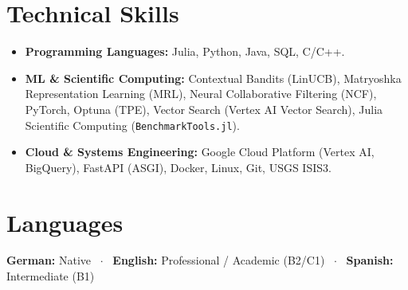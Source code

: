 \documentclass[10pt, a4paper]{article}
\begin{document}
\section*{Technical Skills}

\begin{itemize}[leftmargin=0.15in, label=\textbullet, itemsep=2pt, topsep=2pt]
  \item \textbf{Programming Languages:} Julia, Python, Java, SQL, C/C++.
  \item \textbf{ML \& Scientific Computing:} Contextual Bandits (LinUCB), Matryoshka Representation Learning (MRL), Neural Collaborative Filtering (NCF), PyTorch, Optuna (TPE), Vector Search (Vertex AI Vector Search), Julia Scientific Computing (\texttt{BenchmarkTools.jl}).
  \item \textbf{Cloud \& Systems Engineering:} Google Cloud Platform (Vertex AI, BigQuery), FastAPI (ASGI), Docker, Linux, Git, USGS ISIS3.
\end{itemize}

\section*{Languages}

\noindent\textbf{German:} Native \ $\cdot$ \ \textbf{English:} Professional / Academic (B2/C1) \ $\cdot$ \ \textbf{Spanish:} Intermediate (B1)
\end{document}
